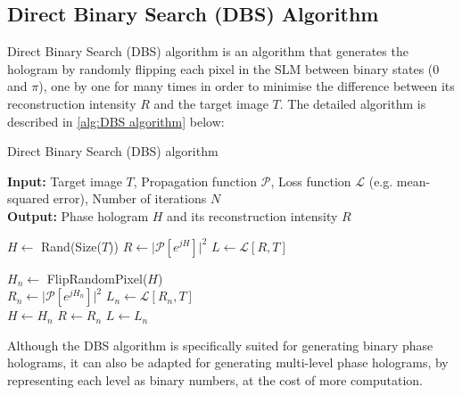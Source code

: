 \newpage
\subsection{Direct Binary Search (DBS) Algorithm}\label{sec:Direct Binary Search (DBS) Algorithm}
Direct Binary Search (DBS) algorithm \cite{Seldowitz1987} is an algorithm that generates the hologram by randomly flipping each pixel in the SLM between binary states (0 and $\pi$), one by one for many times in order to minimise the difference between its reconstruction intensity $R$ and the target image $T$. The detailed algorithm is described in \cref{alg:DBS algorithm} below:
\begin{algorithm}[H]
  \caption{Direct Binary Search (DBS) algorithm}\label{alg:DBS algorithm}
  \textbf{Input:} Target image $T$, Propagation function $\mathcal{P}$, Loss function $\mathcal{L}$ (e.g. mean-squared error), Number of iterations $N$ \\
  \textbf{Output:} Phase hologram $H$ and its reconstruction intensity $R$
  \begin{algorithmic}
    \State $H \gets$ Rand(Size($T$))
    \State $R \gets \vert \mathcal{P}[e^{jH}] \vert ^2$
    \State $L \gets \mathcal{L} [R, T]$

    \State $H_n \gets$ FlipRandomPixel($H$)\\
    \State $R_n \gets \vert \mathcal{P}[e^{jH_n}] \vert ^2$
    \State $L_n \gets \mathcal{L} [R_n, T]$\\
    \State $H \gets H_n$
    \State $R \gets R_n$
    \State $L \gets L_n$
    \EndIf
    \EndFor
  \end{algorithmic}
\end{algorithm}

Although the DBS algorithm is specifically suited for generating binary phase holograms, it can also be adapted for generating multi-level phase holograms, by representing each level as binary numbers, at the cost of more computation.

